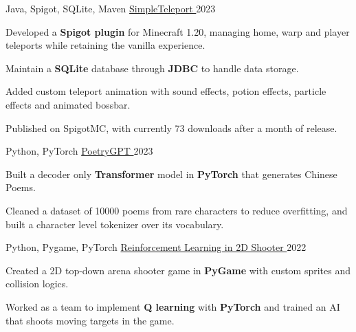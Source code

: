 

\begin{cventries}

  \cventry
    {Java, Spigot, SQLite, Maven} %
    {\href{https://github.com/shiqui/simple-teleport}{SimpleTeleport {\faLink}}} %
    {} %
    {2023} %
    {
      \begin{cvitems} %
        \item {Developed a \textbf{Spigot plugin} for Minecraft 1.20, managing home, warp and player teleports while retaining the vanilla experience.}
        \item {Maintain a \textbf{SQLite} database through \textbf{JDBC} to handle data storage.}
        \item {Added custom teleport animation with sound effects, potion effects, particle effects and animated bossbar.}
        \item {Published on SpigotMC, with currently 73 downloads after a month of release.}
      \end{cvitems}
    }

  \cventry
  {Python, PyTorch} %
  {\href{https://github.com/shiqui/PoetryGPT}{PoetryGPT {\faLink}}} %
  {} %
  {2023} %
  {
    \begin{cvitems} %
      \item {Built a decoder only \textbf{Transformer} model in \textbf{PyTorch} that generates Chinese Poems.}
      \item {Cleaned a dataset of 10000 poems from rare characters to reduce overfitting, and built a character level tokenizer over its vocabulary.}
    \end{cvitems}
  }

  \cventry
    {Python, Pygame, PyTorch} %
    {\href{https://github.com/shiqui/TSDP-Reinforcement-Learning-in-Video-Games}{Reinforcement Learning in 2D Shooter {\faLink}}} %
    {} %
    {2022} %
    {
      \begin{cvitems} %
        \item {Created a 2D top-down arena shooter game in \textbf{PyGame} with custom sprites and collision logics.}
        \item {Worked as a team to implement \textbf{Q learning} with \textbf{PyTorch} and trained an AI that shoots moving targets in the game.}
      \end{cvitems}
    }


\end{cventries}
